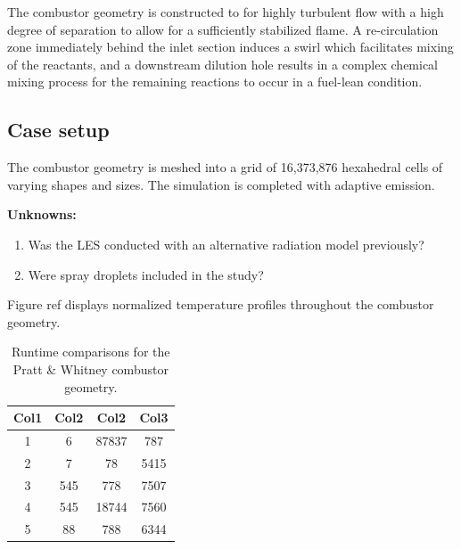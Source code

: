 The combustor geometry is constructed to for highly turbulent flow with a high degree of separation to allow for a sufficiently stabilized flame.
A re-circulation zone immediately behind the inlet section induces a swirl which facilitates mixing of the reactants, and a downstream dilution hole results in a complex chemical mixing process for the remaining reactions to occur in a fuel-lean condition. 



\subsection{Case setup}
The combustor geometry is meshed into a grid of 16,373,876 hexahedral cells of varying shapes and sizes. The simulation is completed with adaptive emission.



\textbf{Unknowns:}
\begin{enumerate}
    \item Was the LES conducted with an alternative radiation model previously?
    \item Were spray droplets included in the study?
\end{enumerate}

Figure ref{} displays normalized temperature profiles throughout the combustor geometry.


\begin{table}[h!]
\centering
\begin{tabular}{||c c c c||} 
 \hline
 Col1 & Col2 & Col2 & Col3 \\ [0.5ex] 
 \hline\hline
 1 & 6 & 87837 & 787 \\ 
 2 & 7 & 78 & 5415 \\
 3 & 545 & 778 & 7507 \\
 4 & 545 & 18744 & 7560 \\
 5 & 88 & 788 & 6344 \\ [1ex] 
 \hline
\end{tabular}
\caption{Runtime comparisons for the Pratt \& Whitney combustor geometry.}
\label{table:PW_runtime_table}
\end{table}
